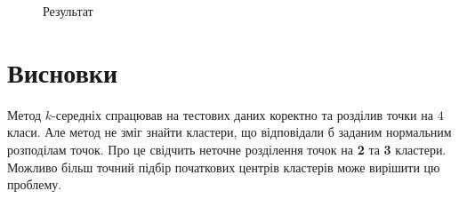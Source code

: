 \documentclass[a4paper,12pt]{article}
\begin{document}
\newpage
\begin{figure}[h]
	\caption{Результат}
	\label{fig:3}
\end{figure}

\section{Висновки}

Метод $k$-середніх спрацював на тестових даних коректно та розділив точки на $4$ класи. Але метод не зміг знайти кластери, що відповідали б заданим нормальним розподілам точок. Про це свідчить неточне розділення точок на \textbf{2} та \textbf{3} кластери. Можливо більш точний підбір початкових центрів кластерів може вирішити цю проблему.
\end{document}
